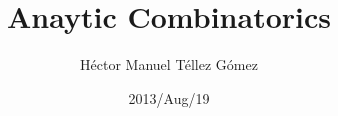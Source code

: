 ﻿\frontmatter
\title{Anaytic Combinatorics}
\author{Héctor Manuel Téllez Gómez}
\date{2013/Aug/19}
\maketitle

\tableofcontents

\mainmatter

